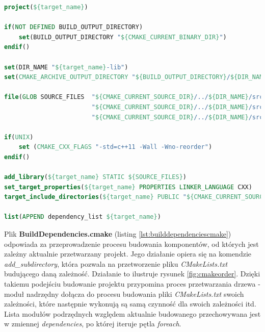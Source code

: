 \begin{lstlisting}[language=cmake, caption={Plik \textit{BuildLibrary.cmake} będący częścią systemu budującego projekt GGSS. Poszczególne linie odpowiadają m.in. za dodanie nowego projektu, określenie katalogu, w którym odbędzie się budowanie i katalogu docelowego, zebranie plików biblioteki oraz dodanie jej do projektu. }, label={lst:buildlibrarycmake}]
project(${target_name})

if(NOT DEFINED BUILD_OUTPUT_DIRECTORY)
    set(BUILD_OUTPUT_DIRECTORY "${CMAKE_CURRENT_BINARY_DIR}")
endif()

set(DIR_NAME "${target_name}-lib")
set(CMAKE_ARCHIVE_OUTPUT_DIRECTORY "${BUILD_OUTPUT_DIRECTORY}/${DIR_NAME}/lib") 

file(GLOB SOURCE_FILES  "${CMAKE_CURRENT_SOURCE_DIR}/../${DIR_NAME}/src/*.cpp"
                        "${CMAKE_CURRENT_SOURCE_DIR}/../${DIR_NAME}/src/*.cxx"
                        "${CMAKE_CURRENT_SOURCE_DIR}/../${DIR_NAME}/src/*.c")

if(UNIX)
    set (CMAKE_CXX_FLAGS "-std=c++11 -Wall -Wno-reorder")
endif()

add_library(${target_name} STATIC ${SOURCE_FILES})
set_target_properties(${target_name} PROPERTIES LINKER_LANGUAGE CXX)
target_include_directories(${target_name} PUBLIC "${CMAKE_CURRENT_SOURCE_DIR}/include")

list(APPEND dependency_list ${target_name})
\end{lstlisting}


Plik \textbf{BuildDependencies.cmake} (listing \ref{lst:builddependenciescmake}) odpowiada za przeprowadzenie procesu budowania komponentów, od których jest zależny aktualnie przetwarzany projekt. Jego działanie opiera się na komendzie \textit{add\_subdirectory}, która pozwala na przetworzenie pliku \textit{CMakeLists.txt} budującego daną zależność. Działanie to ilustruje rysunek \ref{fig:cmakeorder}. Dzięki takiemu podejściu budowanie projektu przypomina proces przetwarzania drzewa - moduł nadrzędny dołącza do procesu budowania pliki \textit{CMakeLists.txt} swoich zależności, które następnie wykonują są samą czynność dla swoich zależności itd. Lista modułów podrzędnych względem aktualnie budowanego przechowywana jest w zmiennej \textit{dependencies}, po której iteruje pętla \textit{foreach}.


